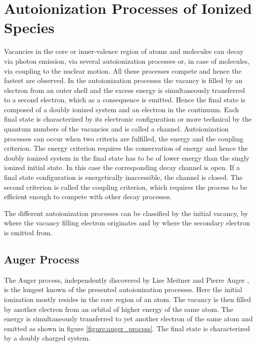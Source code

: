 \chapter{Autoionization Processes of Ionized Species}
\label{chapter:autoionization}
Vacancies in the core or inner-valence region of atoms and molecules
can decay via photon emission, via several autoionization processes or,
in case of molecules, via coupling to
the nuclear motion. All these
processes compete and hence the fastest are observed. In the autoionization
processes
the vacancy is filled by an electron from an outer shell and the excess
energy is simultaneously transferred to a second electron, which as a
consequence
is emitted. Hence the final state is composed of a doubly ionized system
and an electron in the continuum. Each final state is characterized by its
electronic configuration or more technical by the quantum numbers of the
vacancies and is called a channel. Autoionization processes can
occur when two criteria are fulfilled, the energy and the coupling criterion.
The energy criterion requires the conservation of energy and hence
the doubly ionized system in the
final state has to be of lower energy than the singly ionized initial state.
In this case the corresponding decay channel is open. If a final
state configuration
is energetically inaccessible, the channel is closed.
The second criterion is called the coupling criterion, which requires the
process to be efficient enough to compete with other decay processes.

The different autoionization processes can be classified by the initial
vacancy, by where the
vacancy filling electron originates and by where the secondary electron is
emitted from.

\section{Auger Process}
The Auger process, independently discovered by Lise Meitner \cite{Meitner22}
and Pierre Auger \cite{Auger23}, is the longest known of the presented
autoionization processes. Here
the initial ionization mostly resides in the core region of an atom. The vacancy
is then filled by another electron from an orbital of higher energy of
the same atom. The
energy is simultaneously transferred to yet another electron of the same atom and
emitted as shown in figure \ref{figure:auger_process}. The final state is
characterized by a doubly charged system.

